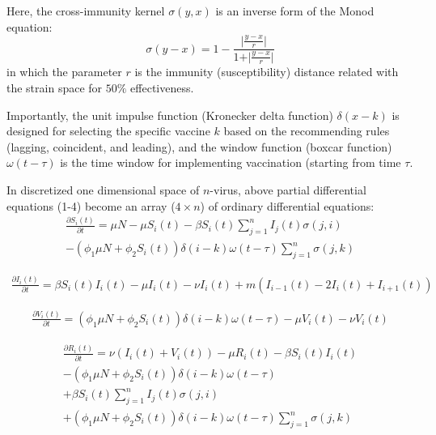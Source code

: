 \documentclass[preprint,12pt]{elsarticle}
\begin{document}
Here, the cross-immunity kernel \(\sigma(y,x)\) is an inverse form of the Monod equation:
\begin{equation}
  \label{eq:Immunity}
  \sigma(y-x) = 1 - \frac{\vert {\frac{y-x}{r}} \vert}{1 + \vert {\frac{y-x}{r}} \vert}
\end{equation}
in which the parameter \(r\) is the immunity (susceptibility) distance related with the strain space for \(50\%\) effectiveness. 

Importantly, the unit impulse function (Kronecker delta function) \(\delta(x-k)\) is designed for selecting the specific vaccine \(k\) based on the recommending rules (lagging, coincident, and leading), and the window function (boxcar function) \(\omega(t-\tau)\) is the time window for implementing vaccination (starting from time \(\tau\).


\newpage
In discretized one dimensional space of \(n\)-virus, above partial differential equations (1-4) become an array (\(4 \times n\)) of ordinary differential equations:
\begin{align}
  \label{eq:S}
  \frac{\partial S_i(t)}{\partial t} = \mu N - \mu S_i(t) - \beta S_i(t) \sum_{j=1}^{n} I_j(t)\sigma(j,i)
 \nonumber\\
  -(\phi_{1}\mu N + \phi_{2} S_i(t)) \delta(i-k)\omega(t-\tau) \sum_{j=1}^{n} \sigma(j,k)
\end{align}

\begin{align}
  \label{eq:I}
  \frac{\partial I_i(t)}{\partial t} = \beta S_i(t) I_i(t) - \mu I_i(t) - \nu I_i(t) + m(I_{i-1}(t) - 2I_{i}(t) + I_{i+1}(t))
\end{align}

\begin{align}
  \label{eq:V}
  \frac{\partial V_i(t)}{\partial t} = (\phi_{1}\mu N + \phi_{2} S_i(t)) \delta(i-k)\omega(t-\tau) - \mu V_i(t) - \nu V_i(t)
\end{align}

\begin{align}
  \label{eq:R}
  \frac{\partial R_i(t)}{\partial t} = \nu (I_i(t) + V_i(t)) - \mu R_i(t) - \beta S_i(t) I_i(t) 
   \nonumber\\
   -(\phi_{1}\mu N + \phi_{2} S_i(t)) \delta(i-k)\omega(t-\tau)
   \nonumber\\
  +\beta S_i(t)\sum_{j=1}^{n} I_j(t)\sigma(j,i)
  \nonumber\\
  +(\phi_{1}\mu N + \phi_{2} S_i(t)) \delta(i-k)\omega(t-\tau) \sum_{j=1}^{n} \sigma(j,k)
\end{align}
\end{document}
